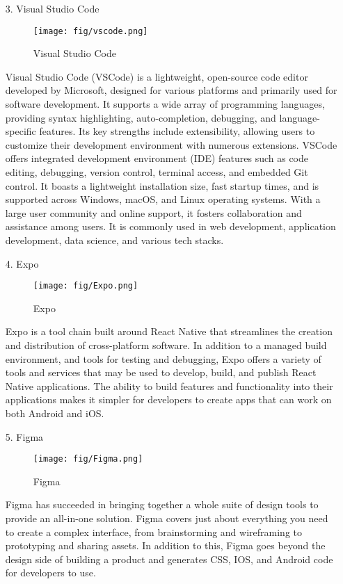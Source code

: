 \documentclass[conference]{IEEEtran}
\begin{document}
\begin{enumerate}
    \item[3.]Visual Studio Code
    \begin{figure}[h]
    \centering
    \textbf{}    
    \texttt{[image: fig/vscode.png]}
    \label{fig:Visual Studio Code}
    \caption{Visual Studio Code} 
    \end{figure}
    \item[]Visual Studio Code (VSCode) is a lightweight, open-source code editor developed by Microsoft, designed for various platforms and primarily used for software development. It supports a wide array of programming languages, providing syntax highlighting, auto-completion, debugging, and language-specific features. Its key strengths include extensibility, allowing users to customize their development environment with numerous extensions. VSCode offers integrated development environment (IDE) features such as code editing, debugging, version control, terminal access, and embedded Git control. It boasts a lightweight installation size, fast startup times, and is supported across Windows, macOS, and Linux operating systems. With a large user community and online support, it fosters collaboration and assistance among users. It is commonly used in web development, application development, data science, and various tech stacks.\\

    \item[4.]Expo
    \begin{figure}[h]
    \centering
    \texttt{[image: fig/Expo.png]}
    \label{fig:Expo}
    \caption{Expo} 
    \end{figure}
    \item[]Expo is a tool chain built around React Native that streamlines the creation and distribution of cross-platform software. In addition to a managed build environment, and tools for testing and debugging, Expo offers a variety of tools and services that may be used to develop, build, and publish React Native applications. The ability to build features and functionality into their applications makes it simpler for developers to create apps that can work on both Android and iOS. \\

    \item[5.]Figma \cite{staiano2022designing}
    \begin{figure}[h]
    \centering
    \texttt{[image: fig/Figma.png]}
    \label{fig:Figma}
    \caption{Figma} 
    \end{figure}
    \item[]Figma has succeeded in bringing together a whole suite of design tools to provide an all-in-one solution. Figma covers just about everything you need to create a complex interface, from brainstorming and wireframing to prototyping and sharing assets. In addition to this, Figma goes beyond the design side of building a product and generates CSS, IOS, and Android code for developers to use.\\


\end{enumerate}
\end{document}
